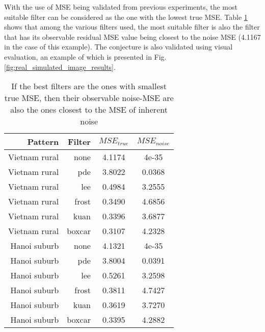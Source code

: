 \documentclass[journal]{IEEEtran}
\begin{document}
With the use of MSE being validated from previous experiments, 
	the most suitable filter can be considered as the one with the lowest true MSE.
Table \ref{tab:mse_true_noise_log_domain} shows that among the various filters used, 
	the most suitable filter is also the filter that 
		has its observable residual MSE value being closest to the noise MSE (4.1167 in the case of this example).
The conjecture is also validated using visual evaluation, an example of
	which is presented in Fig. \ref{fig:real_simulated_image_results}.

\begin{table}
\centering
\begin{tabular}{r|r|c|c}
Pattern  & Filter  & $MSE_{true}$   & $MSE_{noise}$      \\%
\hline
Vietnam rural	& none		& 4.1174	& 4e-35\\
Vietnam rural	& pde			& 3.8022	& 0.0368\\
Vietnam rural	& lee			& 0.4984	& 3.2555\\
Vietnam rural	& frost		& 0.3490	& 4.6856\\
Vietnam rural	& kuan		& 0.3396	& 3.6877\\
Vietnam rural	& boxcar	& 0.3107	& 4.2328\\
\hline
Hanoi suburb	& none		& 4.1321	& 4e-35\\
Hanoi suburb	& pde			& 3.8004	& 0.0391\\
Hanoi suburb	& lee			& 0.5261	& 3.2598\\
Hanoi suburb	& frost		& 0.3811	& 4.7427\\
Hanoi suburb	& kuan		& 0.3619	& 3.7270\\
Hanoi suburb	& boxcar	& 0.3395	& 4.2882\\
\hline
\end{tabular}

\caption{If the best filters are the ones with smallest true MSE, then their observable noise-MSE are also the ones closest to the MSE of inherent noise}
\label{tab:mse_true_noise_log_domain}
\end{table}
\end{document}
